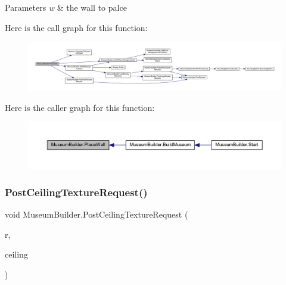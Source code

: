 \begin{DoxyParams}{Parameters}
{\em w} & the wall to palce\\
\hline
\end{DoxyParams}
Here is the call graph for this function\+:
\nopagebreak
\begin{figure}[H]
\begin{center}
\leavevmode
\includegraphics[width=350pt]{class_museum_builder_a5a8c364b8b6a51193a5c00d898668835_cgraph}
\end{center}
\end{figure}
Here is the caller graph for this function\+:
\nopagebreak
\begin{figure}[H]
\begin{center}
\leavevmode
\includegraphics[width=350pt]{class_museum_builder_a5a8c364b8b6a51193a5c00d898668835_icgraph}
\end{center}
\end{figure}
\mbox{\label{class_museum_builder_a5b79838dee5015763177bdceca168f5c}} 
\subsubsection{\texorpdfstring{Post\+Ceiling\+Texture\+Request()}{PostCeilingTextureRequest()}}
{\footnotesize\ttfamily void Museum\+Builder.\+Post\+Ceiling\+Texture\+Request (\begin{DoxyParamCaption}\item[{\mbox{\hyperlink{class_room}{Room}}}]{r,  }\item[{Game\+Object}]{ceiling }\end{DoxyParamCaption})\hspace{0.3cm}{\ttfamily [private]}}



